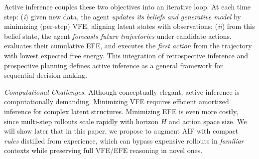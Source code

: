 \documentclass{article} %
\begin{document}
Active inference couples these two objectives into an iterative loop.  
At each time step:  
({\it i}) given new data, the agent \emph{updates its beliefs and generative model} by minimizing (per-step) VFE, aligning latent states with observations;  
({\it ii}) from this belief state, the agent \emph{forecasts future trajectories} under candidate actions, evaluates their cumulative EFE, and executes the {\it first action} from the trajectory with lowest expected free energy.  
This integration of retrospective inference and prospective planning defines active inference as a general framework for sequential decision-making.  

{\it Computational Challenges.} Although conceptually elegant, active inference is computationally demanding.  
Minimizing VFE requires efficient amortized inference for complex latent structures.  
Minimizing EFE is even more costly, since multi-step rollouts scale rapidly with horizon $H$ and action space size.  
We will show later that in this paper, we propose to augment AIF with compact \emph{rules} distilled from experience, which can bypass expensive rollouts in {\it familiar} contexts while preserving full VFE/EFE reasoning in novel ones.  
\end{document}
